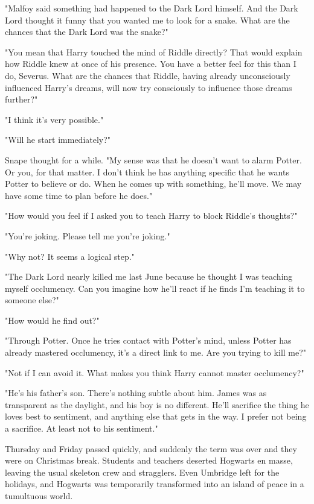 \documentclass[a4paper,11pt]{article}
\begin{document}
"Malfoy said something had happened to the Dark Lord himself. And the Dark Lord thought it funny that you wanted me to look for a snake. What are the chances that the Dark Lord was the snake?"

"You mean that Harry touched the mind of Riddle directly? That would explain how Riddle knew at once of his presence. You have a better feel for this than I do, Severus. What are the chances that Riddle, having already unconsciously influenced Harry's dreams, will now try consciously to influence those dreams further?"

"I think it's very possible."

"Will he start immediately?"

Snape thought for a while. "My sense was that he doesn't want to alarm Potter. Or you, for that matter. I don't think he has anything specific that he wants Potter to believe or do. When he comes up with something, he'll move. We may have some time to plan before he does."

"How would you feel if I asked you to teach Harry to block Riddle's thoughts?"

"You're joking. Please tell me you're joking."

"Why not? It seems a logical step."

"The Dark Lord nearly killed me last June because he thought I was teaching myself occlumency. Can you imagine how he'll react if he finds I'm teaching it to someone else?"

"How would he find out?"

"Through Potter. Once he tries contact with Potter's mind, unless Potter has already mastered occlumency, it's a direct link to me. Are you trying to kill me?"

"Not if I can avoid it. What makes you think Harry cannot master occlumency?"

"He's his father's son. There's nothing subtle about him. James was as transparent as the daylight, and his boy is no different. He'll sacrifice the thing he loves best to sentiment, and anything else that gets in the way. I prefer not being a sacrifice. At least not to his sentiment."

Thursday and Friday passed quickly, and suddenly the term was over and they were on Christmas break. Students and teachers deserted Hogwarts en masse, leaving the usual skeleton crew and stragglers. Even Umbridge left for the holidays, and Hogwarts was temporarily transformed into an island of peace in a tumultuous world.
\end{document}
